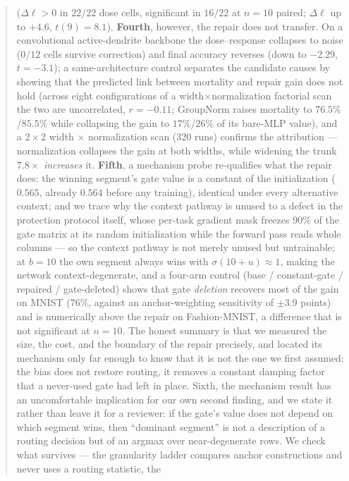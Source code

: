 \documentclass[10pt]{article}
\begin{document}
\begin{abstract}
($\Delta\ell>0$ in $22/22$ dose cells, significant in $16/22$ at $n{=}10$
paired; $\Delta\ell$ up to $+4.6$, $t(9){=}8.1$). \textbf{Fourth}, however, the
repair does not transfer. On a convolutional active-dendrite backbone the
dose--response collapses to noise ($0/12$ cells survive correction) and final accuracy
reverses (down to $-2.29$, $t{=}-3.1$); a same-architecture control separates
the candidate causes by showing that the predicted link between mortality and repair gain does not hold
(across eight configurations of a width$\times$normalization factorial scan the two are
uncorrelated, $r=-0.11$; GroupNorm raises mortality to $76.5\%$/$85.5\%$ while collapsing the gain to
$17\%$/$26\%$ of its bare-MLP value), and a $2\times 2$ width $\times$
normalization scan ($320$ runs) confirms the attribution --- normalization
collapses the gain at both widths, while widening the trunk $7.8\times$
\emph{increases} it. \textbf{Fifth}, a mechanism probe re-qualifies what the
repair does: the winning segment's gate value is a constant of the
initialization ($0.565$, already $0.564$ before any training), identical under
every alternative context; and we trace why the context pathway is unused to a
defect in the protection protocol itself, whose per-task gradient mask freezes
$90\%$ of the gate matrix at its random initialization while the forward pass
reads whole columns --- so the context pathway is not merely unused but
untrainable; at $b{=}10$ the own segment always wins with
$\sigma(10+u)\approx 1$, making the network context-degenerate, and a
four-arm control (base / constant-gate / repaired / gate-deleted) shows that
gate \emph{deletion} recovers most of the gain on MNIST ($76\%$, against an
anchor-weighting sensitivity of $\pm3.9$ points) and is numerically above the
repair on Fashion-MNIST, a difference that is not significant at $n{=}10$. The honest summary is that we measured the size, the cost, and
the boundary of the repair precisely, and located its mechanism only far enough
to know that it is not the one we first assumed: the bias does not restore
routing, it removes a constant damping factor that a never-used gate had left
in place. Sixth, the mechanism result has an uncomfortable implication for our
own second finding, and we state it rather than leave it for a reviewer: if
the gate's value does not depend on which segment wins, then ``dominant
segment'' is not a description of a routing decision but of an argmax over
near-degenerate rows. We check what survives --- the granularity ladder
compares anchor constructions and never uses a routing statistic, the

\end{abstract}
\end{document}
